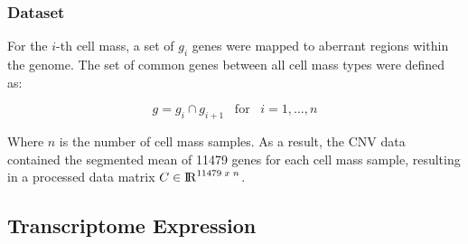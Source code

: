 \begin{table}[ht]
\caption{Significant CNV Abberations Mapped to Gene Ensembl ID in KIRC} %
\centering %
\label{table:mapgene}
\end{table}


\subsubsection{Dataset}

For the $i$-th cell mass, a set of $g_i$ genes were mapped to aberrant regions within the genome. The set of common genes between all cell mass types were defined as:

\begin{equation}
    g = g_i \cap g_{i+1} \;\;\; \mbox{for} \;\;\; i = 1,\ldots,n
\end{equation}

\noindent
Where $n$ is the number of cell mass samples. As a result, the CNV data contained the segmented mean of 11479 genes for each cell mass sample, resulting in a processed data matrix $C \in {\rm I\!R}^{11479 \; x \; n}$.

\subsection{Transcriptome Expression}

